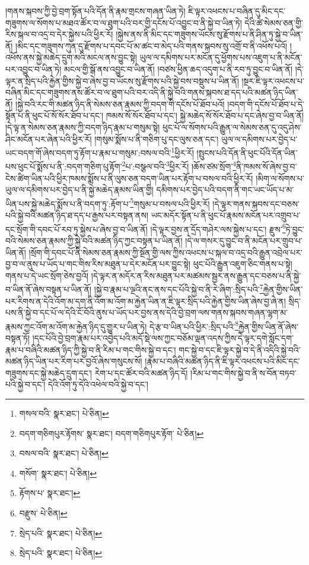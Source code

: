 །གནས་སྐབས་ཀྱི་བྱེ་བྲག་སྟོན་པའི་དོན་ནི་རྣམ་གྲངས་གཞན་ཡིན་ཏེ། ཇི་ལྟར་འཕངས་པ་བཞིན་དུ་མིང་དང་གཟུགས་ལ་སོགས་པ་མཐའ་ཚོར་བ་ལ་ཐུག་པའི་བར་གྱི་དངོས་པོ་འབྱུང་བ་ནི་སྐྱེ་བ་ཡིན་ཏེ། དེའི་ཚེ་སེམས་ཅན་གྱི་རིས་སྐལ་བ་འདྲ་བ་དེར་སྐྱེས་པའི་ཕྱིར་རོ། །སྐྱེས་ནས་ནི་མིང་དང་གཟུགས་ཡོངས་སུ་རྫོགས་པ་ནི་ཤིན་ཏུ་སྐྱེ་བ་ཡིན་ནོ། །མིང་དང་གཟུགས་ཀུན་དུ་རྫོགས་པ་དབང་པོ་མ་ཚང་བ་མེད་པའི་གནས་སྐབས་སུ་འགྲོ་བ་ནི་འཕོས་པའོ། །འཕོས་ནས་སྐྱེ་མཆེད་དྲུག་མའི་མངལ་ནས་བྱུང་སྟེ། ཡུལ་ལ་དམིགས་པར་མངོན་དུ་ཕྱོགས་པས་འཇུག་པ་ནི་མངོན་པར་འབྱུང་བ་ཡིན་ཏེ། མངལ་གྱི་སྒོ་ནས་འབྱུང་བ་ཡིན་ནོ། །བཙས་ཕྱིན་ཆད་འདུག་པ་ནི་རབ་ཏུ་བྱུང་བ་ཡིན་ནོ། །དེ་ལྟར་ན་སྲིད་པའི་རྐྱེན་གྱིས་སྐྱེ་བ་ཞེས་བྱ་བ་ཡོངས་སུ་རྫོགས་པའི་སྐྱེ་བས་བསྡུས་པ་ཡིན་ནོ། །སྔར་ཇི་ལྟར་འཕངས་པ་བཞིན་མིང་དང་གཟུགས་ནས་ཚོར་བ་ལ་ཐུག་པའི་བར་འདི་ནི་སྐྱེ་བའི་གནས་སྐབས་ཐ་དད་པའི་མཚན་ཉིད་ཡིན་ནོ། །སྐྱེ་བའི་རང་གི་མཚན་ཉིད་ནི་སེམས་ཅན་རྣམས་ཀྱི་བདག་གི་དངོས་པོ་ཐོབ་པའོ། །བདག་གི་དངོས་པོ་ཐོབ་པ་དེ་སྟོན་པ་ནི་ཕུང་པོ་སོ་སོར་ཐོབ་པ་དང་། ཁམས་སོ་སོར་ཐོབ་པ་དང་། སྐྱེ་མཆེད་སོ་སོར་ཐོབ་པ་དང་ཞེས་བྱ་བ་ཡིན་ནོ། །དེ་ལྟ་ན་སེམས་ཅན་རྣམས་ཀྱི་བདག་ཉིད་རྣམ་པ་གསུམ་སྟེ། ཕུང་པོ་ལ་སོགས་པའི་རྒྱུན་ལ་སེམས་ཅན་དུ་འདུ་ཤེས་ཤིང་མངོན་པར་ཞེན་པའི་ཕྱིར་རོ། །གསུམ་སྨོས་པ་ནི་གཅིག་པུ་དང་ལུས་ཅན་དང་། ཡུལ་ལ་དམིགས་པར་བྱེད་པ་ཡང་བདག་གོ་ཞེས་བདག་ཏུ་རྟོག་པ་རྣམ་པ་གསུམ་:བསལ་བའི་\footnote{གསལ་བའི་  སྣར་ཐང་།  པེ་ཅིན། }ཕྱིར་རོ། །སྤུངས་པའི་དོན་ནི་ཕུང་པོའི་དོན་ཡིན་པས་ཕུང་པོ་སྨོས་པ་ནི་:བདག་གཅིག་པུ་རྟོག་\footnote{བདག་གཅིགཔུར་རྟོགས་  སྣར་ཐང་། བདག་གཅིགཔུར་རྟོག་  པེ་ཅིན། }པ་:བསྩལ་བའི་\footnote{བསལ་བའི་  སྣར་ཐང་།  པེ་ཅིན། }ཕྱིར་རོ། །ཆོས་ཙམ་སྲོག་\footnote{གསོག་  སྣར་ཐང་།  པེ་ཅིན། }ནི་ཁམས་སོ་ཞེས་བྱ་བ་ངེས་ཚིག་ཡིན་པའི་ཕྱིར་ཁམས་སྨོས་པ་ནི་ལུས་ཅན་བདག་ཡིན་པར་རྟོག་པ་བསལ་བའི་ཕྱིར་རོ། །མིག་ལ་སོགས་པ་ཡུལ་ལ་དམིགས་པར་བྱེད་པ་ནི་སྐྱེ་མཆེད་རྣམས་ཡིན་གྱི། དམིགས་པར་བྱེད་པའི་བདག་ནི་གང་ཡང་ཡོད་པ་མ་ཡིན་པས་སྐྱེ་མཆེད་སྨོས་པ་ནི་བདག་ཏུ་:རྟོག་པ་\footnote{རྟོགས་པ་  སྣར་ཐང་། }གསུམ་པ་བསལ་པའི་ཕྱིར་རོ། །དེ་ལྟར་གནས་སྐབས་དང་བཅས་པའི་སྐྱེ་བའི་མཚན་ཉིད་ཐ་དད་པ་རྒྱས་པར་བསྟན་ནས། ཡང་མདོར་སྟོན་པ་ནི་ཕུང་པོ་རྣམས་མངོན་པར་འགྲུབ་པ་དང་སྲོག་གི་དབང་པོ་རབ་ཏུ་སྐྱེས་པ་ཞེས་བྱ་བ་ཡིན་ནོ། །དེ་ལྟར་བྱས་ན་དྲོད་གཤེར་ལས་སྐྱེས་པ་དང་། རྫུས་\footnote{བརྫུས་  པེ་ཅིན། }ཏེ་བྱུང་བའི་སེམས་ཅན་རྣམས་ཀྱི་སྐྱེ་བའི་མཚན་ཉིད་ཀྱང་བསྟན་པ་ཡིན་ནོ། །དེ་ལ་གསར་དུ་བྱུང་བ་ནི་མངོན་པར་གྲུབ་པ་ཡིན་ནོ། །སྲོག་གི་དབང་པོ་ནི་སེམས་ཅན་རྣམས་ཀྱི་སྔོན་གྱི་ལས་ཀྱིས་འཕངས་པ་སྐལ་བ་འདྲ་བའི་རྒྱུན་འབྲེལ་པར་བྱ་བ་ལ་ནུས་པ་ཡོད་པ་གང་གིས་རིས་མཐུན་པ་དེར་མངོན་པར་བྱུང་སྟེ། ཕུང་པོའི་རྒྱུན་འཇུག་ཅིང་གནས་པ་སྟེ། གནས་པ་དེ་ཡང་སྲོག་ཅེས་བྱའོ། །དེ་ལྟར་ན་མདོར་ན་རིས་མཐུན་པར་མཚམས་སྦྱར་ནས་རྒྱུན་དང་བཅས་པ་ནི་སྐྱེ་བ་ཡིན་ནོ་ཞེས་བསྟན་པ་ཡིན་ནོ། །སྐྱེ་བ་རྣམ་པ་ལྔའི་ནང་ནས་དང་པོའི་སྐྱེ་བ་ནི་རེ་ཞིག་:སྲིད་པའི་\footnote{སྲེད་པའི་  སྣར་ཐང་།  པེ་ཅིན། }རྐྱེན་གྱིས་ཡིན་པར་རིགས་ན་དེའི་འོག་མ་དག་ནི་འོག་མ་འོག་མ་རྐྱེན་ཡིན་ན་ཇི་ལྟར་སྲིད་པའི་རྐྱེན་གྱིས་ཡིན་ཞེས་བྱ་ཞེ་ན། སྲིད་པས་ནི་སྐྱེ་བ་དང་པོ་ལ་དེའི་ངོ་བོའི་ནུས་པ་ཡོད་པར་བྱས་ནས་དེའི་བྱེ་བྲག་ལས་གནས་སྐབས་གཞན་ལྷག་མ་རྣམས་ཀྱང་འོག་མ་འོག་མ་རྐྱེན་ཉིད་དུ་གྱུར་པ་ཡིན་ཏེ། དེ་རྩ་བ་ཡིན་པའི་ཕྱིར་:སྲིད་པའི་\footnote{སྲེད་པའི་  སྣར་ཐང་།  པེ་ཅིན། }རྐྱེན་གྱིས་ཡིན་ནོ་ཞེས་བསྟན་ཏོ། །དང་པོའི་བྱེ་བྲག་རྣམ་པར་འབྱེད་པའི་མདོ་སྡེ་ལས་ཀྱང་བཅོམ་ལྡན་འདས་ཀྱིས་དེ་ལྟར་དགེ་སློང་དག་རྣམ་པ་བཞིའི་མཚན་ཉིད་ཀྱི་སྐྱེ་བ་ནི་རིམ་པ་གང་གིས་སྐྱེ་བ་དང་། གང་སྐྱེ་བ་དང་ཇི་ལྟར་སྐྱེ་བ་དེ་ནི་འདིའི་སྐྱེ་བའི་མཚན་ཉིད་ཡིན་པར་རིག་པར་བྱའོ་ཞེས་གསུངས་སོ། །རྣམ་པ་བཞིའི་མཚན་ཉིད་ནི་ཇི་ལྟར་འཕངས་པའི་མིང་དང་གཟུགས་དང་སྐྱེ་མཆེད་དྲུག་དང་། རེག་པ་དང་ཚོར་བའི་མཚན་ཉིད་དོ། །རིམ་པ་གང་གིས་སྐྱེ་བ་ནི་ས་བོན་བཏབ་པའི་སྐྱེ་བ་དང་། དེའི་འོག་ཏུ་དེའི་འཕེལ་བའི་སྐྱེ་བ་དང་། 